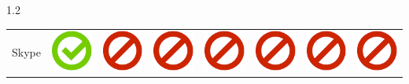 \documentclass[final]{beamer}
\newlength{\twocolwid}
\begin{document}
\begin{frame}[t]
\begin{columns}[t, totalwidth=\textwidth]
\begin{column}{1.2\twocolwid}
\begin{tabular}{ L{8cm} | C{4.5cm} | C{4.5cm} | C{4.5cm} | C{4.5cm} | C{4.5cm} | C{5cm} | C{4.5cm} | }
Skype & \includegraphics[scale=0.5]{pics/haken.png} & \includegraphics[scale=0.5]{pics/nohaken.png} & \includegraphics[scale=0.5]{pics/nohaken.png} & \includegraphics[scale=0.5]{pics/nohaken.png} & \includegraphics[scale=0.5]{pics/nohaken.png} & \includegraphics[scale=0.5]{pics/nohaken.png} & \includegraphics[scale=0.5]{pics/nohaken.png} \tabularnewline

\end{tabular}
\end{column}
\end{columns}
\end{frame}
\end{document}

